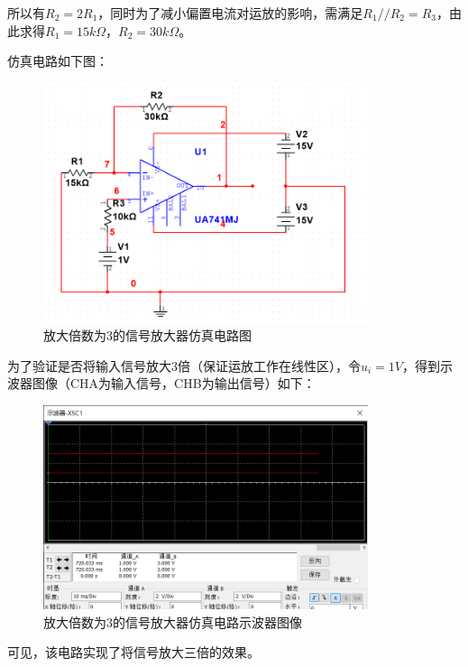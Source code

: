 \documentclass[UTF8]{ctexart}
\begin{document}
所以有$R_2=2R_1$，同时为了减小偏置电流对运放的影响，需满足$R_1//R_2=R_3$，由此求得$R_1=15k\Omega$，$R_2=30k\Omega$。

仿真电路如下图：
\begin{figure}[H]
\centering
\includegraphics[width=0.85\textwidth]{E.png}
\caption{放大倍数为3的信号放大器仿真电路图}
\end{figure}

为了验证是否将输入信号放大3倍（保证运放工作在线性区），令$u_i=1V$，得到示波器图像（CHA为输入信号，CHB为输出信号）如下：
\begin{figure}[H]
\centering
\includegraphics[width=0.85\textwidth]{F.png}
\caption{放大倍数为3的信号放大器仿真电路示波器图像}
\end{figure}


可见，该电路实现了将信号放大三倍的效果。
\end{document}
